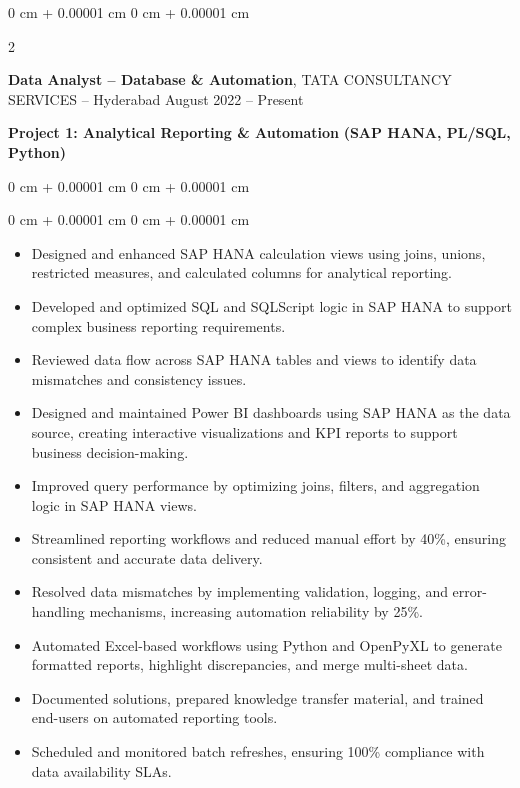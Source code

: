 \documentclass[10pt, letterpaper]{article}
\newenvironment{highlights}{
    \begin{itemize}[
        topsep=0.10 cm,
        parsep=0.10 cm,
        partopsep=0pt,
        itemsep=0pt,
        leftmargin=0 cm + 10pt
    ]
}{
    \end{itemize}
} %
\newenvironment{onecolentry}{
    \begin{adjustwidth}{
        0 cm + 0.00001 cm
    }{
        0 cm + 0.00001 cm
    }
}{
    \end{adjustwidth}
} %
\newenvironment{twocolentry}[2][]{
    \onecolentry
    \def\secondColumn{#2}
    \setcolumnwidth{\fill, 4.5 cm}
    \begin{paracol}{2}
}{
    \switchcolumn \raggedleft \secondColumn
    \end{paracol}
    \endonecolentry
} %
\begin{document}
        
        \begin{twocolentry}{
            August 2022 – Present
        }
            \textbf{Data Analyst – Database \& Automation}, TATA CONSULTANCY SERVICES -- Hyderabad\end{twocolentry}
        \vspace{0.20 cm}
        \textbf{Project 1: Analytical Reporting \& Automation}
        \textbf {(SAP HANA, PL/SQL, Python)}
        \begin{onecolentry}
        \vspace{0.005 cm}
        \end{onecolentry}
        \begin{onecolentry}
            \begin{highlights}
                \item Designed and enhanced SAP HANA calculation views using joins, unions, restricted measures, and calculated columns for analytical reporting.
                \item Developed and optimized SQL and SQLScript logic in SAP HANA to support complex business reporting requirements.
                \item Reviewed data flow across SAP HANA tables and views to identify data mismatches and consistency issues.
                \item Designed and maintained Power BI dashboards using SAP HANA as the data source, creating interactive visualizations and KPI reports to support business decision-making.
                \item Improved query performance by optimizing joins, filters, and aggregation logic in SAP HANA views.
                \item Streamlined reporting workflows and reduced manual effort by 40\%, ensuring consistent and accurate data delivery.
                \item Resolved data mismatches by implementing validation, logging, and error-handling mechanisms, increasing automation reliability by 25\%.
                \item Automated Excel-based workflows using Python and OpenPyXL to generate formatted reports, highlight discrepancies, and merge multi-sheet data.
                \item Documented solutions, prepared knowledge transfer material, and trained end-users on automated reporting tools.
                \item Scheduled and monitored batch refreshes, ensuring 100\% compliance with data availability SLAs.
            \end{highlights}
        \end{onecolentry}
\end{document}
